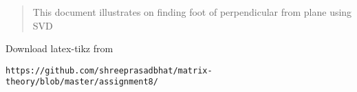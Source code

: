 \documentclass[journal,12pt,twocolumn]{IEEEtran}
\begin{document}
% 
\maketitle
\newpage
\bigskip
\renewcommand{\thefigure}{\theenumi}
\renewcommand{\thetable}{\theenumi}
%
%
\begin{abstract}
This document illustrates on finding foot of perpendicular from plane using SVD
\end{abstract}
Download latex-tikz from
\begin{lstlisting}
https://github.com/shreeprasadbhat/matrix-theory/blob/master/assignment8/
\end{lstlisting}
%
\end{document}
